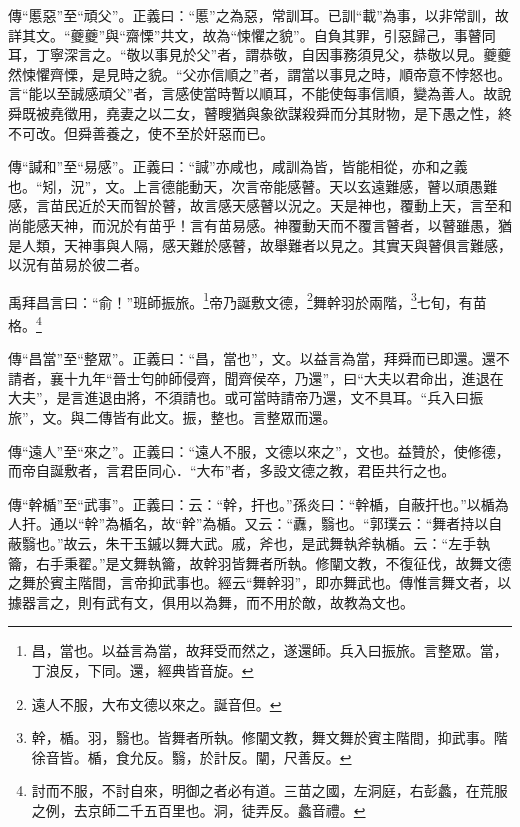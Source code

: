 {\noindent\zhuan{}\fzbyks 傳“慝惡”至“頑父”。正義曰：“慝”之為惡，常訓耳。已訓“載”為事，以非常訓，故詳其文。“夔夔”與“齋慄”共文，故為“悚懼之貌”。自負其罪，引惡歸己，事瞽同耳，丁寧深言之。“敬以事見於父”者，謂恭敬，自因事務須見父，恭敬以見。夔夔然悚懼齊慄，是見時之貌。“父亦信順之”者，謂當以事見之時，順帝意不悖怒也。言“能以至誠感頑父”者，言感使當時暫以順耳，不能使每事信順，變為善人。故說舜既被堯徵用，堯妻之以二女，瞽瞍猶與象欲謀殺舜而分其財物，是下愚之性，終不可改。但舜善養之，使不至於奸惡而已。 \par}

{\noindent\zhuan{}\fzbyks 傳“諴和”至“易感”。正義曰：“諴”亦咸也，咸訓為皆，皆能相從，亦和之義也。“矧，況”，文。上言德能動天，次言帝能感瞽。天以玄遠難感，瞽以頑愚難感，言苗民近於天而智於瞽，故言感天感瞽以況之。天是神也，覆動上天，言至和尚能感天神，而況於有苗乎！言有苗易感。神覆動天而不覆言瞽者，以瞽雖愚，猶是人類，天神事與人隔，感天難於感瞽，故舉難者以見之。其實天與瞽俱言難感，以況有苗易於彼二者。 \par}

禹拜昌言曰：“俞！”班師振旅。\footnote{昌，當也。以益言為當，故拜受而然之，遂還師。兵入曰振旅。言整眾。當，丁浪反，下同。還，經典皆音旋。}帝乃誕敷文德，\footnote{遠人不服，大布文德以來之。誕音但。}舞幹羽於兩階，\footnote{幹，楯。羽，翳也。皆舞者所執。修闡文教，舞文舞於賓主階間，抑武事。階徐音皆。楯，食允反。翳，於計反。闡，尺善反。}七旬，有苗格。\footnote{討而不服，不討自來，明御之者必有道。三苗之國，左洞庭，右彭蠡，在荒服之例，去京師二千五百里也。洞，徒弄反。蠡音禮。}

{\noindent\zhuan{}\fzbyks 傳“昌當”至“整眾”。正義曰：“昌，當也”，文。以益言為當，拜舜而已即還。還不請者，襄十九年“晉士匄帥師侵齊，聞齊侯卒，乃還”，曰“大夫以君命出，進退在大夫”，是言進退由將，不須請也。或可當時請帝乃還，文不具耳。“兵入曰振旅”，文。與二傳皆有此文。振，整也。言整眾而還。 \par}

{\noindent\zhuan{}\fzbyks 傳“遠人”至“來之”。正義曰：“遠人不服，文德以來之”，文也。益贊於，使修德，而帝自誕敷者，言君臣同心．“大布”者，多設文德之教，君臣共行之也。 \par}

{\noindent\zhuan{}\fzbyks 傳“幹楯”至“武事”。正義曰：云：“幹，扞也。”孫炎曰：“幹楯，自蔽扞也。”以楯為人扞。通以“幹”為楯名，故“幹”為楯。又云：“纛，翳也。“郭璞云：“舞者持以自蔽翳也。”故云，朱干玉鏚以舞大武。戚，斧也，是武舞執斧執楯。云：“左手執籥，右手秉翟。”是文舞執籥，故幹羽皆舞者所執。修闡文教，不復征伐，故舞文德之舞於賓主階間，言帝抑武事也。經云“舞幹羽”，即亦舞武也。傳惟言舞文者，以據器言之，則有武有文，俱用以為舞，而不用於敵，故教為文也。 \par}

